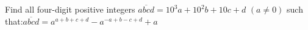 Find all four-digit positive integers $\overline{abcd}=10^3a+10^2b+10c+d$ $(a\ne0)$ such that:$\overline{abcd} =a^{a+b+c+d}-a^{-a+b-c+d}+a$